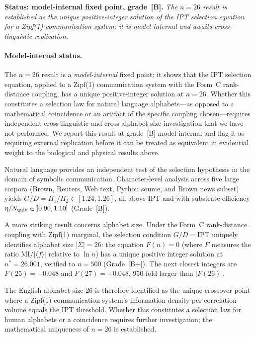 \documentclass[11pt]{article}
\theoremstyle{remark}
\begin{document}
\noindent\textbf{Status: model-internal fixed point, grade~\textbf{[B]}.}
\emph{The $n=26$ result is established as the unique positive-integer solution of
the IPT selection equation for a Zipf(1) communication system; it is model-internal
and awaits cross-linguistic replication.}

\smallskip
\paragraph{Model-internal status.}
The $n=26$ result is a \emph{model-internal} fixed point: it shows that the
IPT selection equation, applied to a Zipf(1) communication system with the Form~C
rank-distance coupling, has a unique positive-integer solution at $n=26$.
Whether this constitutes a selection law for natural language alphabets---as
opposed to a mathematical coincidence or an artifact of the specific coupling
chosen---requires independent cross-linguistic and cross-alphabet-size
investigation that we have not performed.
We report this result at grade~[B] model-internal and flag it as requiring
external replication before it can be treated as equivalent in evidential weight
to the biological and physical results above.

\smallskip
Natural language provides an independent test of the selection hypothesis in the
domain of symbolic communication.
Character-level analysis across five large corpora (Brown, Reuters, Web text,
Python source, and Brown news subset) yields $G/D = H_1/H_2 \in [1.24, 1.26]$,
all above IPT and with substrate efficiency $\eta/N_{\rm univ} \in [0.90, 1.10]$
(Grade~[B]).

A more striking result concerns alphabet size. Under the Form~C rank-distance
coupling with Zipf(1) marginal, the selection condition $G/D = \text{IPT}$
uniquely identifies alphabet size $|\Sigma| = 26$: the equation $F(n) = 0$
(where $F$ measures the ratio $\text{MI}/|\langle f \rangle|$ relative to $\ln n$)
has a unique positive integer solution at $n^* = 26.001$, verified to $n = 500$
(Grade~[B+]).
The next closest integers are $F(25) = -0.048$ and $F(27) = +0.048$, 950-fold
larger than $|F(26)|$.

The English alphabet size 26 is therefore identified as the unique crossover point
where a Zipf(1) communication system's information density per correlation volume
equals the IPT threshold.
Whether this constitutes a selection law for human alphabets or a coincidence
requires further investigation; the mathematical uniqueness of $n = 26$ is
established.
\end{document}
